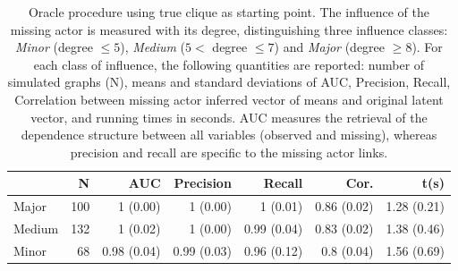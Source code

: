  \begin{table}
\centering
\begin{tabular}{lrrrrrr}
  \hline
  & N & AUC & Precision & Recall & Cor. &t(s) \\ 
  \hline
  Major & 100 & 1 (0.00) & 1 (0.00) & 1 (0.01) & 0.86 (0.02)  & 1.28 (0.21) \\ 
  Medium & 132 & 1 (0.02) & 1 (0.00) & 0.99 (0.04) & 0.83 (0.02)  & 1.38 (0.46)  \\ 
  Minor &  68 & 0.98 (0.04) & 0.99 (0.03) & 0.96 (0.12) & 0.8 (0.04)& 1.56 (0.69) \\ 
   \hline
\end{tabular}
 \caption{\label{tab:oracle} Oracle procedure using true clique as starting point. The influence of the missing actor is measured with its degree, distinguishing three influence classes: \textit{Minor} (degree $\leq 5$), \textit{Medium} ($5<$ degree $\leq 7$) and \textit{Major} (degree $\geq 8$).  For each class of influence, the following quantities are reported:  number of simulated graphs (N), means and standard deviations of AUC, Precision, Recall, Correlation between missing actor inferred vector of means and original latent vector, and running times in seconds. AUC measures the retrieval of the dependence structure between all variables (observed and missing), whereas precision and recall are specific to the missing actor links.}
\end{table}